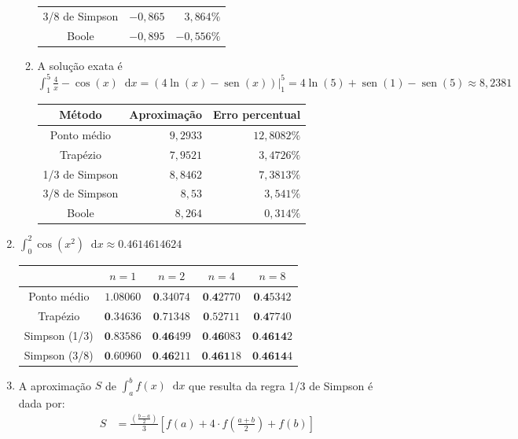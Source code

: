 \documentclass[12pt,a4paper]{article}
\newcommand*\sen{\operatorname{sen}}
\newcommand*\diff{\mathop{}\!\mathrm{d}}
\begin{document}
\begin{enumerate}
\begin{enumerate}
\begin{center}
\begin{tabular}{crr}
3/8 de Simpson & $-0,865$ & $3,864\%$ \\
Boole          & $-0,895$ & $-0,556\%$\\
\hline
\end{tabular}
\end{center}
\item A solução exata é $\int_1^5 \frac{4}{x} - \cos(x) \diff{x} = \left( 4\ln(x) - \sen(x)\right) \Big|_1^5 = 4\ln(5) + \sen(1) - \sen(5) \approx 8,2381$
\begin{center}
\begin{tabular}{crr}
\hline
Método         & Aproximação & Erro percentual \\ \hline
Ponto médio    & $9,2933$ &  $12,8082\%$  \\
Trapézio       & $7,9521$ & $3,4726\%$ \\
1/3 de Simpson & $8,8462$ & $7,3813\%$ \\
3/8 de Simpson & $8,53$ & $3,541\%$ \\
Boole          & $8,264$ & $0,314\%$ \\
\hline
\end{tabular}
\end{center}
\end{enumerate}
\item $\int_0^2 \cos(x^2)\diff{x} \approx 0.4614614624$
\begin{center}
\begin{tabular}{ccccc}
\hline
              & $n=1$     & $n=2$    & $n=4$   & $n=8$ \\ \hline
Ponto médio   & $1.08060$ & $\textbf{0}.34074$ & $\textbf{0.4}2770$ & $\textbf{0.4}5342$ \\
Trapézio      & $\textbf{0}.34636$ & $\textbf{0}.71348$ & $\textbf{0}.52711$ & $\textbf{0.4}7740$ \\
Simpson (1/3) & $\textbf{0}.83586$ & $\textbf{0.46}499$ & $\textbf{0.46}083$ & $\textbf{0.4614}2$ \\
Simpson (3/8) & $\textbf{0}.60960$ & $\textbf{0.46}211$ & $\textbf{0.461}18$ & $\textbf{0.4614}4$ \\
\hline
\end{tabular}
\end{center}
\item A aproximação $S$ de $\int_a^b f(x)\diff{x}$ que resulta da regra 1/3 de Simpson é dada por:
\begin{align*}
S
& = \frac{\left(\frac{b - a}{2}\right)}{3}\left[ f(a) + 4\cdot f\left(\frac{a + b}{2}\right) + f(b) \right] \\

\end{align*}
\end{enumerate}
\end{document}
